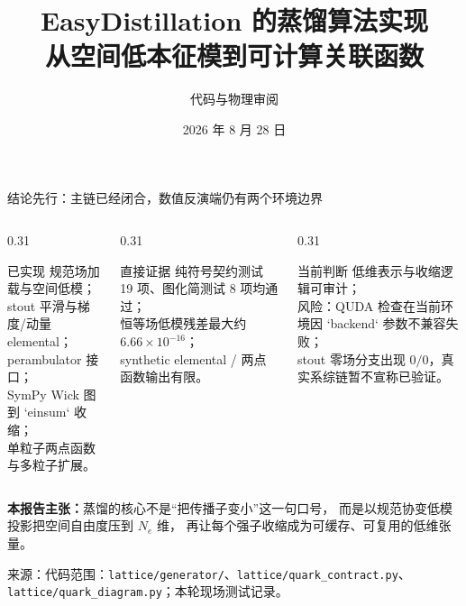 \documentclass[UTF8,aspectratio=169,11pt]{ctexbeamer}
\title[EasyDistillation]{EasyDistillation 的蒸馏算法实现\\[-0.2em]
  \large 从空间低本征模到可计算关联函数}
\author[代码与物理审阅]{代码与物理审阅}
\institute{PyQCD / \codepath{refer/git-rep/EasyDistillation}}
\date{2026 年 8 月 28 日}
\newcommand{\source}[1]{%
  \vspace{0.06em}\par{\raggedright\scriptsize\color{muted}来源：#1\par}}
\newcommand{\codepath}[1]{\nolinkurl{#1}}
\begin{document}
\begin{frame}[plain]
  \titlepage
\end{frame}

\begin{frame}[t]{结论先行：主链已经闭合，数值反演端仍有两个环境边界}
  \begin{columns}[T,totalwidth=\textwidth]
    \begin{column}{0.31\textwidth}
      \begin{block}{已实现}
        \small
        规范场加载与空间低模；\\
        stout 平滑与梯度/动量 elemental；\\
        perambulator 接口；\\
        SymPy Wick 图到 `einsum` 收缩；\\
        单粒子两点函数与多粒子扩展。
      \end{block}
    \end{column}
    \begin{column}{0.31\textwidth}
      \begin{block}{直接证据}
        \small
        纯符号契约测试 19 项、图化简测试 8 项均通过；\\
        恒等场低模残差最大约
        $6.66\times10^{-16}$；\\
        synthetic elemental / 两点函数输出有限。
      \end{block}
    \end{column}
    \begin{column}{0.31\textwidth}
      \begin{block}{当前判断}
        \small
        低维表示与收缩逻辑可审计；\\
        \textcolor{warning}{风险：}QUDA 检查在当前环境因 `backend` 参数不兼容失败；\\
        stout 零场分支出现 $0/0$，真实系综链暂不宣称已验证。
      \end{block}
    \end{column}
  \end{columns}
  \vspace{0.16cm}
  \begin{center}
    \colorbox{good}{\parbox{0.91\linewidth}{\centering
      \textbf{本报告主张：}蒸馏的核心不是“把传播子变小”这一句口号，
      而是以规范协变低模投影把空间自由度压到 $N_e$ 维，
      再让每个强子收缩成为可缓存、可复用的低维张量。}}
  \end{center}
  \source{代码范围：\codepath{lattice/generator/}、\codepath{lattice/quark_contract.py}、\codepath{lattice/quark_diagram.py}；本轮现场测试记录。}
\end{frame}
\end{document}
